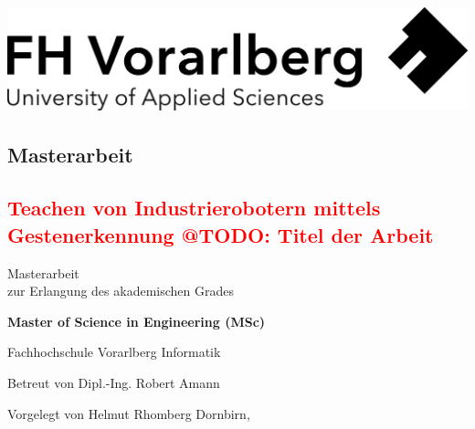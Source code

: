 \documentclass[a4paper,12pt, twoside]{scrreprt}
\begin{document}
\cleardoublepage   %
\thispagestyle{empty}
\begin{titlepage}
  \begin{flushright}
  \includegraphics[width=0.4\linewidth]{Logo-A3}
  \end{flushright}
  \begin{flushleft}
  \section*{Masterarbeit} %
  \subsection*{\textcolor{red}{Teachen von Industrierobotern mittels Gestenerkennung @TODO: Titel der Arbeit}}
  \vspace{1cm}
  
  Masterarbeit\\
  zur Erlangung des akademischen Grades
  \vspace{0.5cm}
  
  \textbf{Master of Science in Engineering (MSc)} %

  \vspace{1cm}
  Fachhochschule Vorarlberg\newline
  Informatik %

  \vspace{0.5cm}
  
  Betreut von\newline
  Dipl.-Ing. Robert Amann %
  
  \vspace{0.5cm}
  
  Vorgelegt von\newline
  Helmut Rhomberg\newline\newline %
  Dornbirn, \todayWithoutDay %
  \end{flushleft}
\end{titlepage}
\end{document}
